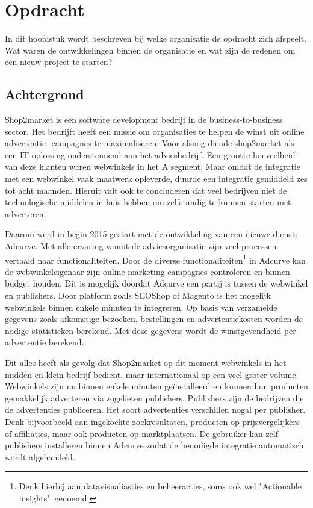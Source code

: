 
\chapter{Opdracht}
In dit hoofdstuk wordt beschreven bij welke organisatie de opdracht zich afspeelt. Wat waren de ontwikkelingen binnen de organisatie en wat zijn de redenen om een nieuw project te starten?

\section{Achtergrond}

Shop2market is een software development bedrijf in de business-to-business sector. Het bedrijft heeft een missie om organisaties te helpen de winst uit online advertentie- campagnes te maximaliseren. 
Voor alsnog diende shop2market als een IT oplossing ondersteunend aan het adviesbedrijf. Een grootte hoeveelheid van deze klanten waren webwinkels in het A segment. Maar omdat de integratie met een webwinkel vaak maatwerk opleverde, duurde een integratie gemiddeld zes tot acht maanden. Hieruit valt ook te concluderen dat veel bedrijven niet de technologische middelen in huis hebben om zelfstandig te kunnen starten met adverteren.

Daarom werd in begin 2015 gestart met de ontwikkeling van een nieuwe dienst: Adcurve. Met alle ervaring vanuit de adviesorganisatie zijn veel processen vertaald naar functionaliteiten. Door de diverse functionaliteiten\footnote{ Denk hierbij aan datavisualiasties en beheeracties, soms ook wel "Actionable insights"\  genoemd.} in Adcurve kan de webwinkeleigenaar zijn online marketing campagnes controleren en binnen budget houden. Dit is mogelijk doordat Adcurve een partij is tussen de webwinkel en publishers. Door platform zoals SEOShop of Magento is het mogelijk webwinkels binnen enkele minuten te integreren. 
Op basis van verzamelde gegevens zoals afkomstige bezoeken, bestellingen en advertentiekosten worden de nodige statistieken berekend. Met deze gegevens wordt de winstgevendheid per advertentie berekend.


Dit alles heeft als gevolg dat Shop2market op dit moment webwinkels in het midden en klein bedrijf  bedient, maar internationaal op een veel groter volume. Webwinkels zijn nu binnen enkele minuten geïnstalleerd en kunnen hun producten gemakkelijk adverteren via zogeheten publishers. Publishers zijn de bedrijven die de advertenties publiceren. Het soort advertenties verschillen nogal per publisher. Denk bijvoorbeeld aan ingekochte zoekresultaten, producten op prijsvergelijkers of affiliaties, maar ook producten op marktplaatsen. De gebruiker kan zelf publishers installeren binnen Adcurve zodat de benodigde integratie automatisch wordt afgehandeld. 

